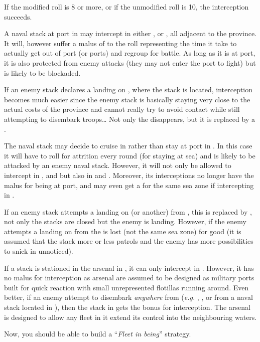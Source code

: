If the modified roll is 8 or more, or if the unmodified roll is 10, the
interception succeeds.

\begin{exemple}
  A naval stack at port in \provinceCornwall may intercept in either
  \seazoneIrlande, \seazoneCeltique or \seazoneManche, all adjacent to the
  province. It will, however suffer a malus of  to the roll
  representing the time it take to actually get out of port (or ports) and
  regroup for battle. As long as it is at port, it is also protected from
  enemy attacks (they may not enter the port to fight) but is likely to be
  blockaded.

  If an enemy stack declares a landing on \provinceCornwall, where the stack
  is located, interception becomes much easier since the enemy stack is
  basically staying very close to the actual costs of the province and cannot
  really try to avoid contact while still attempting to disembark troops\ldots
  Not only the  disappears, but it is replaced by a .

  \smallskip

  The naval stack may decide to cruise in \seazoneCeltique rather than stay at
  port in \provinceCornwall. In this case it will have to roll for attrition
  every round (for staying at sea) and is likely to be attacked by an enemy
  naval stack. However, it will not only be allowed to intercept in
  \seazoneIrlande, \seazoneCeltique and \seazoneManche but also in
  \seazoneGascogne and \seazoneRockall. Moreover, its interceptions no longer
  have the  malus for being at port, and may even get a 
  for the same sea zone if intercepting in \seazoneCeltique.

  If an enemy stack attempts a landing on \provinceCornwall (or another) from
  \seazoneCeltique, this  is replaced by , not only the
  stacks are closed but the enemy is landing. However, if the enemy attempts a
  landing on \provinceCornwall from \seazoneManche the  is lost (not
  the same sea zone) for good (it is assumed that the stack more or less
  patrols and the enemy has more possibilities to snick in unnoticed).

  \smallskip

  If a stack is stationed in the \villePortsmouth arsenal in
  , it can only intercept in \seazoneManche. However, it has
  no malus for interception as arsenal are assumed to be designed as military
  ports built for quick reaction with small unrepresented flotillas running
  around. Even better, if an enemy attempt to disembark \emph{anywhere} from
  \seazoneManche (\emph{e.g.} \provinceWessex, \provinceNormandie,
  \provincePicardie or \provinceKent from a naval stack located in
  \seazoneManche), then the stack in \villePortsmouth gets the 
  bonus for interception. The arsenal is designed to allow any fleet in it
  extend its control into the neighbouring waters.

  \smallskip

  Now, you should be able to build a ``\emph{Fleet in being}'' strategy.
\end{exemple}

